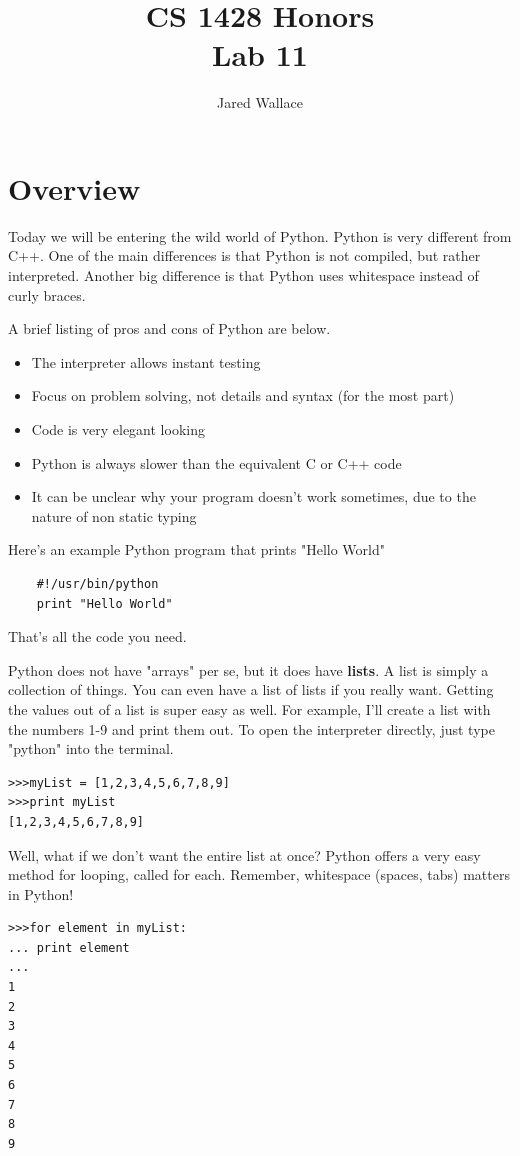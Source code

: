 \documentclass[letterpaper,12pt]{article}
\title{\Large CS 1428 Honors\\Lab 11}
\author{Jared Wallace}
\date{}
\begin{document}
\maketitle

\vspace{30mm}

\section*{Overview}
Today we will be entering the wild world of Python. Python is very different from
C++. One of the main differences is that Python is not compiled, but rather interpreted. Another
big difference is that Python uses whitespace instead of curly braces.

A brief listing of pros and cons of Python are below.
\begin{itemize}
    \item The interpreter allows instant testing
    \item Focus on problem solving, not details and syntax (for the most part)
    \item Code is very elegant looking
    \item Python is always slower than the equivalent C or C++ code
    \item It can be unclear why your program doesn't work sometimes, due to the nature of non static typing
\end{itemize}

Here's an example Python program that prints "Hello World"
\begin{lstlisting}
    #!/usr/bin/python
    print "Hello World"
\end{lstlisting}
That's all the code you need.

Python does not have "arrays" per se, but it does have \textbf{lists}. A list is simply a collection of things.
You can even have a list of lists if you really want. Getting the values out of a list is super easy as well.
For example, I'll create a list with the numbers 1-9 and print them out. To open the interpreter directly, just type
"python" into the terminal.
\begin{lstlisting}
>>>myList = [1,2,3,4,5,6,7,8,9]
>>>print myList
[1,2,3,4,5,6,7,8,9]
\end{lstlisting}

Well, what if we don't want the entire list at once? Python offers a very easy method for looping, called
for each. Remember, whitespace (spaces, tabs) matters in Python!
\begin{lstlisting}
>>>for element in myList:
... print element
...
1
2
3
4
5
6
7
8
9
\end{lstlisting}
\end{document}
